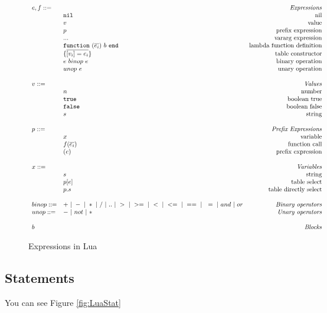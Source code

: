 \documentclass{article}
\begin{document}
\begin{figure}
\caption{Expressions in Lua}
\label{fig:LuaExp}
\[
\begin{array}{llr}
  \mydefhead{e,f ::=\qquad\qquad\qquad\qquad}{Expressions}
  \mydefcase{\tt nil}{nil}
  \mydefcase{v}{value}
  \mydefcase{p}{prefix expression}
  \mydefcase{\tt ...}{vararg expression}
  \mydefcase{\functiondef e b}{lambda function definition}
  \mydefcase{\{\overline{[v_i] = e_i}\}}{table constructor}
  \mydefcase{e ~binop~ e}{binary operation}
  \mydefcase{unop~ e}{unary operation}
  \\
  \mydefhead{v ::=\qquad\qquad\qquad\qquad}{Values}
  \mydefcase{n}{number}
  \mydefcase{\tt true}{boolean true}
  \mydefcase{\tt false}{boolean false}
  \mydefcase{s}{string}
  \\
  \mydefhead{p ::=\qquad\qquad\qquad\qquad}{Prefix Expressions}
  \mydefcase{x}{variable}
  \mydefcase{f(\overline{e_i})}{function call}
  \mydefcase{(e)}{prefix expression}
  
  \\
  \mydefhead{x ::=\qquad\qquad\qquad\qquad}{Variables}
  \mydefcase{s}{string}
  \mydefcase{p[e]}{table select}
  \mydefcase{p.s}{table directly select}
  \\
  binop ::= & + ~|~ - ~|~ * ~|~ / ~|~ .. ~|~ > ~|~ >= ~|~ < ~|~ <= ~|~ == ~|~ ~= ~|~ and ~|~ or & \mbox{\emph{Binary operators}} \\
  unop ::= & - ~|~ not ~|~ *  & \mbox{\emph{Unary operators}} \\
  \\
  \mydefhead{b \qquad\qquad\qquad\qquad}{Blocks}
\end{array}
\]
\end{figure}



\subsection{Statements}
You can see Figure \ref{fig:LuaStat}


\newcommand{\assign}[2]{{\overline{#1_i}}~{=}~{\overline{#2_j}}}
\newcommand{\doe}[1]{\mbox{\tt do}~#1~{\tt end}}
\newcommand{\ife}[3]{\mbox{\tt if}~{#1}~\mbox{\tt then}~{#2}~\mbox{\tt else}~{#3}~{\tt end}}
\newcommand{\whilee}[2]{\mbox{\tt while}~#1~{\tt do}~#2~{\tt end}}
\newcommand{\repeate}[2]{\mbox{\tt repeat}~#2~{\tt until}~#1~}
\newcommand{\for}[3]{\mbox{\tt for}~#1~=~#2_1,~#2_2,~#2_3~{\tt do}~#3~{\tt end}}
\newcommand{\function}[3]{\mbox{\tt function}~#1({\overline{#2_i}})~#3~{\tt end}}
\newcommand{\local}[2]{\mbox{\tt local}~{\assign #1 #2}}
\end{document}
